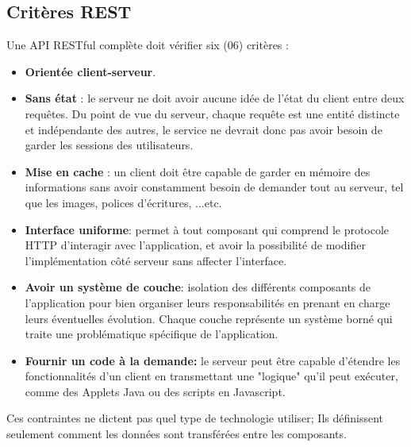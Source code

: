 \newpage
\subsection{Critères REST}
Une API RESTful complète doit vérifier six (06) critères :
\begin{itemize}
	\item \textbf{Orientée client-serveur}.
	      
	\item \textbf{Sans état} : le serveur ne doit avoir aucune idée de l'état du client entre deux requêtes. Du point de vue du serveur, chaque requête est une entité distincte et indépendante des autres, le service ne devrait donc pas avoir besoin de garder les sessions des utilisateurs.
	      
	\item \textbf{Mise en cache} : un client doit être capable de garder en mémoire des informations sans avoir constamment besoin de demander tout au serveur, tel que les images, polices d'écritures, ...etc.
	      
	\item \textbf{Interface uniforme}: permet à tout composant qui comprend le protocole HTTP d'interagir avec l'application, et avoir la possibilité de modifier l'implémentation côté serveur sans affecter l'interface.
	      
	\item \textbf{Avoir un système de couche}: isolation des différents composants de l'application pour bien organiser leurs responsabilités en prenant en charge leurs éventuelles évolution. Chaque couche représente un système borné qui traite une problématique spécifique de l'application.
	      
	\item \textbf{Fournir un code à la demande: } le serveur peut être capable d'étendre les fonctionnalités d'un client en transmettant une "logique" qu'il peut exécuter, comme des Applets Java ou des scripts en Javascript.
	      
\end{itemize}
Ces contraintes ne dictent pas quel type de technologie utiliser; Ils définissent seulement comment les données sont transférées entre les composants.

